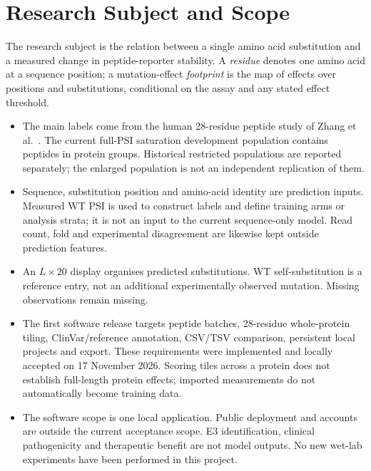 \section{Research Subject and Scope}
The research subject is the relation between a single amino acid substitution and a measured change
in peptide-reporter stability. A \emph{residue} denotes one amino acid at a sequence position; a
mutation-effect \emph{footprint} is the map of effects over positions and substitutions, conditional on
the assay and any stated effect threshold.
\begin{itemize}
  \item The main labels come from the human 28-residue peptide study of Zhang et al.\ \citep{zhang2023}.
        The current full-PSI saturation development population contains \nVthreeNPeptides{} peptides
        in \nVthreeNGroups{} protein groups. Historical restricted populations are reported separately;
        the enlarged population is not an independent replication of them.
  \item Sequence, substitution position and amino-acid identity are prediction inputs. Measured WT
        PSI is used to construct labels and define training arms or analysis strata; it is not an input to
        the current sequence-only model. Read count, fold and experimental disagreement are likewise
        kept outside prediction features.
  \item An $L\times20$ display organises predicted substitutions. WT self-substitution is a reference
        entry, not an additional experimentally observed mutation. Missing observations remain missing.
  \item The first software release targets peptide batches, 28-residue whole-protein tiling,
        ClinVar/reference annotation, CSV/TSV comparison, persistent local projects and export.
        These requirements were implemented and locally accepted on 17 November 2026. Scoring tiles across a protein does not establish
        full-length protein effects; imported measurements do not automatically become training data.
  \item The software scope is one local application. Public deployment and accounts are outside the
        current acceptance scope. E3 identification, clinical pathogenicity and therapeutic benefit are
        not model outputs. No new wet-lab experiments have been performed in this project.
\end{itemize}

